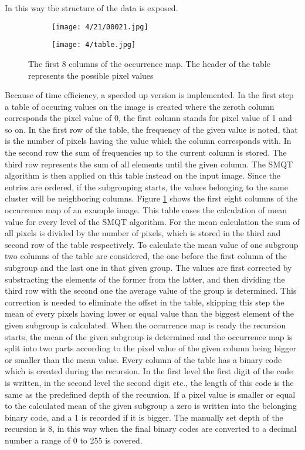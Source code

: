 \documentclass[draft,final]{vutinfth} %
\begin{document}
In this way the structure of the data is exposed.
\begin{figure}[h]
  \centering
  \begin{subfigure}[t]{0.09\columnwidth}
    \centering
    \texttt{[image: 4/21/00021.jpg]}
  \end{subfigure}
  \begin{subfigure}[t]{0.9\columnwidth}
    \centering
    \texttt{[image: 4/table.jpg]}
  \end{subfigure}
  \caption{The first 8 columns of the occurrence map. The header of the table represents the possible pixel values }
  \label{fig:fans:table} %
\end{figure}
\par
Because of time efficiency, a speeded up version is implemented.
In the first step a table of occuring values on the image is created where the zeroth column corresponds the pixel value of 0, the first column stands for pixel value of 1 and so on.
In the first row of the table, the frequency of the given value is noted, that is the number of pixels having the value which the column corresponds with.
In the second row the sum of frequencies up to the current column is stored.
The third row represents the sum of all elements until the given column.
The SMQT algorithm is then applied on this table instead on the input image.
Since the entries are ordered, if the subgrouping starts, the values belonging to the same cluster will be neighboring columns.
Figure \ref{fig:fans:table} shows the first eight columns of the occurrence map of an example image.
This table eases the calculation of mean value for every level of the SMQT algorithm.
For the mean calculation the sum of all pixels is divided by the number of pixels, which is stored in the third and second row of the table respectively. 
To calculate the mean value of one subgroup two columns of the table are considered, the one before the first column of the subgroup and the last one in that given group.
The values are first corrected by substracting the elements of the former from the latter, and then dividing the third row with the second one the average value of the group is determined.
This correction is needed to eliminate the offset in the table, skipping this step the mean of every pixels having lower or equal value than the biggest element of the given subgroup is calculated.
When the occurrence map is ready the recursion starts, the mean of the given subgroup is determined and the occurrence map is split into two parts according to the pixel value of the given column being bigger or smaller than the mean value. 
Every column of the table has a binary code which is created during the recursion.
In the first level the first digit of the code is written, in the second level the second digit etc., the length of this code is the same as the predefined depth of the recursion.
If a pixel value is smaller or equal to the calculated mean of the given subgroup a zero is written into the belonging binary code, and a 1 is recorded if it is bigger.
The manually set depth of the recursion is 8, in this way when the final binary codes are converted to a decimal number a range of 0 to 255 is covered.
\end{document}
